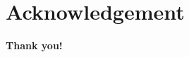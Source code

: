 \documentclass[10pt]{beamer}
\begin{document}
\section*{Acknowledgement}

\begin{frame}
    \vspace{1.0cm}
    \centering
    \textcolor{myNewColorA}{\Huge \textbf{Thank you!}}
\end{frame}








\end{document}
